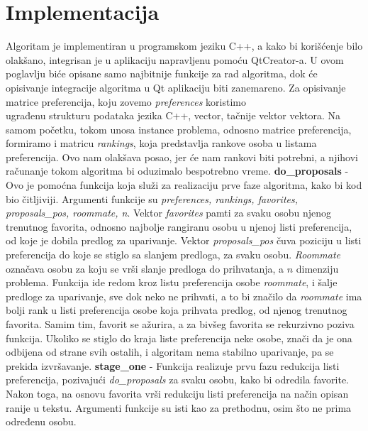 \documentclass[a4paper]{article}
\begin{document}
\section{Implementacija}
Algoritam je implementiran u programskom jeziku C++, a kako bi korišćenje bilo olakšano, integrisan je u aplikaciju napravljenu pomoću QtCreator-a. U ovom poglavlju biće opisane samo najbitnije funkcije za rad algoritma, dok će opisivanje integracije algoritma u Qt aplikaciju biti zanemareno.
\newline
Za opisivanje matrice preferencija, koju zovemo \textit{preferences} koristimo \\ ugrađenu strukturu podataka jezika C++, vector, tačnije vektor vektora. Na samom početku, tokom unosa instance problema, odnosno matrice preferencija, formiramo i matricu \textit{rankings}, koja predstavlja rankove osoba u listama preferencija. Ovo nam olakšava posao, jer će nam rankovi biti potrebni, a njihovi računanje tokom algoritma bi oduzimalo bespotrebno vreme.
\newline
\textbf{do\_proposals} - Ovo je pomoćna funkcija koja služi za realizaciju prve faze algoritma, kako bi kod bio čitljiviji. Argumenti funkcije su \textit{preferences, rankings, favorites, proposals\_pos, roommate, n}. Vektor \textit{favorites} pamti za svaku osobu njenog trenutnog favorita, odnosno najbolje rangiranu osobu u njenoj listi preferencija, od koje je dobila predlog za uparivanje. Vektor \textit{proposals\_pos} čuva poziciju u listi preferencija do koje se stiglo sa slanjem predloga, za svaku osobu. \textit{Roommate} označava osobu za koju se vrši slanje predloga do prihvatanja, a $n$ dimenziju problema. Funkcija ide redom kroz listu preferencija osobe \textit{roommate}, i šalje predloge za uparivanje, sve dok neko ne prihvati, a to bi značilo da \textit{roommate} ima bolji rank u listi preferencija osobe koja prihvata predlog, od njenog trenutnog favorita. Samim tim, favorit se ažurira, a za bivšeg favorita se rekurzivno poziva funkcija. Ukoliko se stiglo do kraja liste preferencija neke osobe, znači da je ona odbijena od strane svih ostalih, i algoritam nema stabilno uparivanje, pa se prekida izvršavanje.
\newline
\textbf{stage\_one} - Funkcija realizuje prvu fazu redukcija listi preferencija, pozivajući \textit{do\_proposals} za svaku osobu, kako bi odredila favorite. Nakon toga, na osnovu favorita vrši redukciju listi preferencija na način opisan ranije u tekstu. Argumenti funkcije su isti kao za prethodnu, osim što ne prima određenu osobu.
\newline
\end{document}
